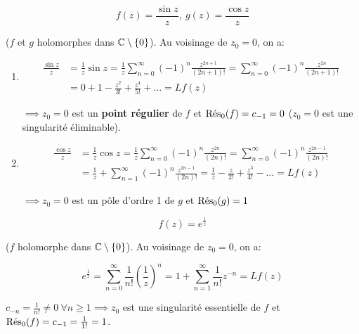 \begin{example}[4]
    \[ f(z) = \frac{\sin z}{z},\ g(z) = \frac{\cos z}{z} \]
    
    ($f$ et $g$ holomorphes dans $\Cx \setminus \{0\}$).
    Au voisinage de $z_0 = 0$, on a:
    
    \begin{enumerate}[label=\alph*)]
        \item 
        \begin{align*}
        \frac{\sin z}{z} &= \frac{1}{z} \sin z = \frac{1}{z} \sum_{n = 0}^\infty (-1)^n \frac{z^{2n + 1}}{(2n + 1)!} = \sum_{n = 0}^\infty (-1)^n \frac{z^{2n}}{(2n + 1)!}
        \\&= 0 + 1 - \frac{z^2}{3!} + \frac{z^4}{5!} + \ldots = Lf(z)
        \end{align*}
        
        $\implies z_0 = 0$ est un \textbf{point régulier} de $f$ et $\Res_0(f) = c_{-1} = 0$ ($z_0 = 0$ est une singularité éliminable).
        
        \item 
        \begin{align*}
        \frac{\cos z}{z} &= \frac{1}{z} \cos z = \frac{1}{z} \sum_{n = 0}^\infty (-1)^n \frac{z^{2n}}{(2n)!} = \sum_{n = 0}^\infty (-1)^n \frac{z^{2n - 1}}{(2n)!}
        \\&= \frac{1}{z} + \sum_{n = 1}^\infty (-1)^n \frac{z^{2n - 1}}{(2n)!}
        = \frac{1}{z} - \frac{z}{2!} + \frac{z^3}{4!} - \ldots = Lf(z)
        \end{align*}
        
        $\implies z_0 = 0$ est un pôle d'ordre 1 de $g$ et $\Res_0(g) = 1$
    \end{enumerate}
\end{example}

\begin{example}[5]
    \[ f(z) = e^{\frac{1}{z}} \]
    
    ($f$ holomorphe dans $\Cx \setminus \{0\}$).
    Au voisinage de $z_0 = 0$, on a:
    
    \[
    e^{\frac{1}{z}} = \sum_{n=0}^\infty \frac{1}{n!} \left(\frac{1}{z}\right)^n = 1 + \sum_{n=1}^\infty \frac{1}{n!}z^{-n} = Lf(z)
    \]
    
    $c_{-n} = \frac{1}{n!} \neq 0 \ \forall n \geq 1 \implies z_0$ est une singularité essentielle de $f$ et $\Res_0(f) = c_{-1} = \frac{1}{1!} = 1$.
\end{example}
